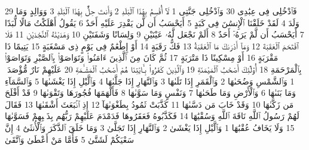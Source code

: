 {\tiny\colorbox{cl_aya}{29}} فَٱدْخُلِى فِى عِبَٰدِى
{\tiny\colorbox{cl_aya}{30}} وَٱدْخُلِى جَنَّتِى
{\tiny\colorbox{cl_aya}{1}} لَآ أُقْسِمُ بِهَٰذَا ٱلْبَلَدِ
{\tiny\colorbox{cl_aya}{2}} وَأَنتَ حِلٌّۢ بِهَٰذَا ٱلْبَلَدِ
{\tiny\colorbox{cl_aya}{3}} وَوَالِدٍ وَمَا وَلَدَ
{\tiny\colorbox{cl_aya}{4}} لَقَدْ خَلَقْنَا ٱلْإِنسَٰنَ فِى كَبَدٍ
{\tiny\colorbox{cl_aya}{5}} أَيَحْسَبُ أَن لَّن يَقْدِرَ عَلَيْهِ أَحَدٌ
{\tiny\colorbox{cl_aya}{6}} يَقُولُ أَهْلَكْتُ مَالًا لُّبَدًا
{\tiny\colorbox{cl_aya}{7}} أَيَحْسَبُ أَن لَّمْ يَرَهُۥٓ أَحَدٌ
{\tiny\colorbox{cl_aya}{8}} أَلَمْ نَجْعَل لَّهُۥ عَيْنَيْنِ
{\tiny\colorbox{cl_aya}{9}} وَلِسَانًا وَشَفَتَيْنِ
{\tiny\colorbox{cl_aya}{10}} وَهَدَيْنَٰهُ ٱلنَّجْدَيْنِ
{\tiny\colorbox{cl_aya}{11}} فَلَا ٱقْتَحَمَ ٱلْعَقَبَةَ
{\tiny\colorbox{cl_aya}{12}} وَمَآ أَدْرَىٰكَ مَا ٱلْعَقَبَةُ
{\tiny\colorbox{cl_aya}{13}} فَكُّ رَقَبَةٍ
{\tiny\colorbox{cl_aya}{14}} أَوْ إِطْعَٰمٌ فِى يَوْمٍ ذِى مَسْغَبَةٍ
{\tiny\colorbox{cl_aya}{15}} يَتِيمًا ذَا مَقْرَبَةٍ
{\tiny\colorbox{cl_aya}{16}} أَوْ مِسْكِينًا ذَا مَتْرَبَةٍ
{\tiny\colorbox{cl_aya}{17}} ثُمَّ كَانَ مِنَ ٱلَّذِينَ ءَامَنُوا۟ وَتَوَاصَوْا۟ بِٱلصَّبْرِ وَتَوَاصَوْا۟ بِٱلْمَرْحَمَةِ
{\tiny\colorbox{cl_aya}{18}} أُو۟لَٰٓئِكَ أَصْحَٰبُ ٱلْمَيْمَنَةِ
{\tiny\colorbox{cl_aya}{19}} وَٱلَّذِينَ كَفَرُوا۟ بِـَٔايَٰتِنَا هُمْ أَصْحَٰبُ ٱلْمَشْـَٔمَةِ
{\tiny\colorbox{cl_aya}{20}} عَلَيْهِمْ نَارٌ مُّؤْصَدَةٌۢ
{\tiny\colorbox{cl_aya}{1}} وَٱلشَّمْسِ وَضُحَىٰهَا
{\tiny\colorbox{cl_aya}{2}} وَٱلْقَمَرِ إِذَا تَلَىٰهَا
{\tiny\colorbox{cl_aya}{3}} وَٱلنَّهَارِ إِذَا جَلَّىٰهَا
{\tiny\colorbox{cl_aya}{4}} وَٱلَّيْلِ إِذَا يَغْشَىٰهَا
{\tiny\colorbox{cl_aya}{5}} وَٱلسَّمَآءِ وَمَا بَنَىٰهَا
{\tiny\colorbox{cl_aya}{6}} وَٱلْأَرْضِ وَمَا طَحَىٰهَا
{\tiny\colorbox{cl_aya}{7}} وَنَفْسٍ وَمَا سَوَّىٰهَا
{\tiny\colorbox{cl_aya}{8}} فَأَلْهَمَهَا فُجُورَهَا وَتَقْوَىٰهَا
{\tiny\colorbox{cl_aya}{9}} قَدْ أَفْلَحَ مَن زَكَّىٰهَا
{\tiny\colorbox{cl_aya}{10}} وَقَدْ خَابَ مَن دَسَّىٰهَا
{\tiny\colorbox{cl_aya}{11}} كَذَّبَتْ ثَمُودُ بِطَغْوَىٰهَآ
{\tiny\colorbox{cl_aya}{12}} إِذِ ٱنۢبَعَثَ أَشْقَىٰهَا
{\tiny\colorbox{cl_aya}{13}} فَقَالَ لَهُمْ رَسُولُ ٱللَّهِ نَاقَةَ ٱللَّهِ وَسُقْيَٰهَا
{\tiny\colorbox{cl_aya}{14}} فَكَذَّبُوهُ فَعَقَرُوهَا فَدَمْدَمَ عَلَيْهِمْ رَبُّهُم بِذَنۢبِهِمْ فَسَوَّىٰهَا
{\tiny\colorbox{cl_aya}{15}} وَلَا يَخَافُ عُقْبَٰهَا
{\tiny\colorbox{cl_aya}{1}} وَٱلَّيْلِ إِذَا يَغْشَىٰ
{\tiny\colorbox{cl_aya}{2}} وَٱلنَّهَارِ إِذَا تَجَلَّىٰ
{\tiny\colorbox{cl_aya}{3}} وَمَا خَلَقَ ٱلذَّكَرَ وَٱلْأُنثَىٰٓ
{\tiny\colorbox{cl_aya}{4}} إِنَّ سَعْيَكُمْ لَشَتَّىٰ
{\tiny\colorbox{cl_aya}{5}} فَأَمَّا مَنْ أَعْطَىٰ وَٱتَّقَىٰ
